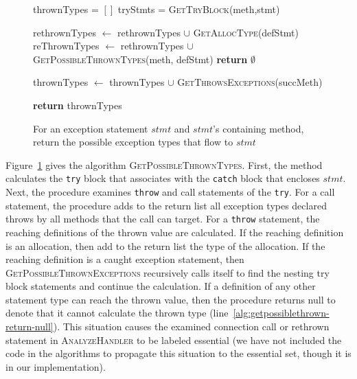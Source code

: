 \begin{figure}[t]
\begin{algorithmic}[1]
\scriptsize
{}
\State thrownTypes = $[]$
\State tryStmts = \textsc{GetTryBlock}(meth,stmt)



\State rethrownTypes $\gets$ rethrownTypes $\cup$ 
\State \hspace{1cm} \textsc{GetAllocType}(defStmt)
\State reThrownTypes $\gets$ rethrownTypes $\cup$
\State \hspace{1cm} \textsc{GetPossibleThrownTypes}(meth, defStmt)
\Else 
\State \textbf{return} $\emptyset$
\label{alg:getpossiblethrown-return-null}
\EndIf
\EndFor


\State thrownTypes $\gets$ thrownTypes $\cup$ 
\State \hspace{1cm}\textsc{GetThrowsExceptions}(succMeth)
\EndFor

\EndIf

\EndFor

\State \textbf{return} thrownTypes

\EndProcedure
\end{algorithmic}
\caption{For an exception statement $stmt$ and $stmt$'s containing
  method, return the possible exception types that flow to
  $stmt$}\label{alg:GetPossibleThrownTypes}
\end{figure}

Figure~\ref{alg:GetPossibleThrownTypes} gives the algorithm
\textsc{GetPossibleThrownTypes}. First, the method calculates the
\lstinline!try! block that associates with the \lstinline!catch! block
that encloses $stmt$. Next, the procedure examines \lstinline!throw!
and call statements of the \lstinline!try!.  For a call statement, the
procedure adds to the return list all exception types declared throws
by all methods that the call can target.  For a \lstinline!throw!
statement, the reaching definitions of the thrown value are
calculated.  If the reaching definition is an allocation, then add to
the return list the type of the allocation.  If the reaching
definition is a caught exception statement, then
\textsc{GetPossibleThrownExceptions} recursively calls itself to find
the nesting try block statements and continue the calculation.  If a
definition of any other statement type can reach the thrown value,
then the procedure returns null to denote that it cannot calculate the
thrown type (line~\ref{alg:getpossiblethrown-return-null}).  This
situation causes the examined connection call or rethrown statement in
\textsc{AnalyzeHandler} to be labeled essential (we have not included
the code in the algorithms to propagate this situation to the
essential set, though it is in our implementation).



